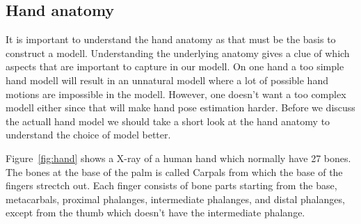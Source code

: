 \documentclass[a4paper,11pt]{kth-mag}
\begin{document}
\subsection{Hand anatomy}
It is important to understand the hand anatomy as that must be the basis to construct a modell.
Understanding the underlying anatomy gives a clue of which aspects that are important to capture in our modell.
On one hand a too simple hand modell will result in an unnatural modell where a lot of possible hand motions are impossible in the modell.
However, one doesn't want a too complex modell either since that will make hand pose estimation harder.
Before we discuss the actuall hand model we should take a short look at the hand anatomy to understand the choice of model better.

Figure~\ref{fig:hand} shows a X-ray of a human hand which normally have 27 bones. 
The bones at the base of the palm is called Carpals from which the base of the fingers strectch out.
Each finger consists of bone parts starting from the base, metacarbals, proximal phalanges, intermediate phalanges, and distal phalanges, except from the thumb which doesn't have the intermediate phalange.
\end{document}
